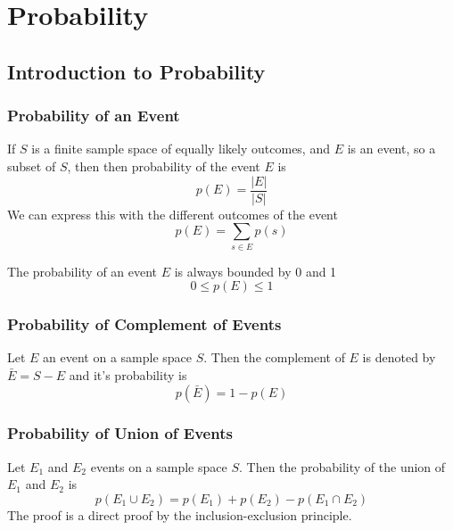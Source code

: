\documentclass{article}
\begin{document}
\newpage
\section{Probability}
\subsection{Introduction to Probability}
\subsubsection{Probability of an Event} If $ S $ is a finite sample space of equally likely outcomes, and $ E $ is an event, so a subset of $ S $, then then probability of the event $ E $ is
\begin{equation}
p(E) = \frac{|E|}{|S|}
\end{equation}
We can express this with the different outcomes of the event
\begin{equation}
p(E) = \sum_{s \in E}p(s)
\end{equation}

\begin{tcolorbox}[width=12.1cm, leftrule=3mm]
The probability of an event $ E $ is always bounded by 0 and 1
\begin{equation}
0 \leq p(E) \leq 1
\end{equation}
\end{tcolorbox}

\subsubsection{Probability of Complement of Events} Let $ E $ an event on a sample space $ S $. Then the complement of $ E $ is denoted by $ \bar{E} = S - E $ and it's probability is
\begin{equation}
p(\bar{E}) = 1 - p(E)
\end{equation}

\subsubsection{Probability of Union of Events} Let $ E_1 $ and $ E_2 $ events on a sample space $ S $. Then the probability of the union of $ E_1 $ and $ E_2 $ is
\begin{equation}
p(E_1 \cup E_2) = p(E_1) + p(E_2) - p(E_1 \cap E_2)
\end{equation}
The proof is a direct proof by the inclusion-exclusion principle.
\end{document}
